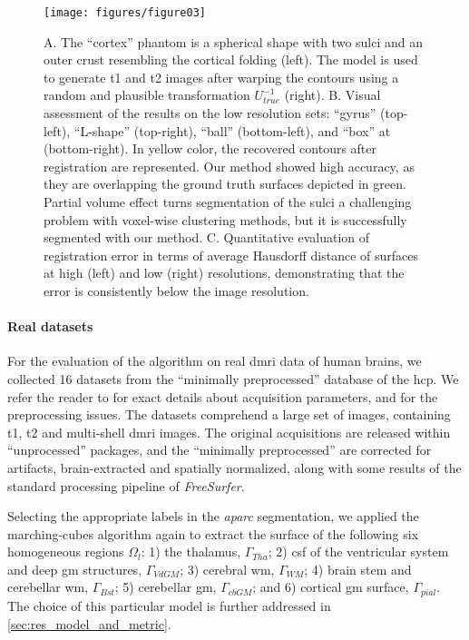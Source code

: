 \begin{figure*}
	\texttt{[image: figures/figure03]}
	\caption{A. The ``cortex'' phantom is a spherical shape with two sulci and an
	  outer crust resembling the cortical folding (left).
	The model is used to generate \gls*{t1} and \gls*{t2} images after warping the
	  contours using a random and plausible transformation $U_{true}^{-1}$ (right).
	B. Visual assessment of the results on the low resolution sets:
	  ``gyrus'' (top-left), ``L-shape'' (top-right), ``ball'' (bottom-left),
	  and ``box'' at (bottom-right).
	In yellow color, the recovered contours after registration are represented.
	Our method showed high accuracy, as they are overlapping the ground truth surfaces
	  depicted in green.
	Partial volume effect turns segmentation of the sulci a challenging problem with voxel-wise
	  clustering methods, but it is successfully segmented with our method.
	C. Quantitative evaluation of registration error in terms of average Hausdorff distance of
	  surfaces at high (left) and low (right) resolutions, demonstrating that the error is
	  consistently below the image resolution.
	  }\label{fig:phantom}
\end{figure*}

\paragraph*{Real datasets} %
\label{sec:human_connectome}
%
For the evaluation of the algorithm on real \gls*{dmri} data of human brains,
  we collected 16 datasets from the ``minimally preprocessed''
	 database of the \gls*{hcp}.
We refer the reader to \citep{essen_human_2012} for exact details about acquisition
  parameters, and \citep{glasser_minimal_2013} for the preprocessing issues.
The datasets comprehend a large set of images, containing \gls*{t1}, \gls*{t2} and
  multi-shell \gls*{dmri} images.
The original acquisitions are released within ``unprocessed'' packages, and
  the ``minimally preprocessed'' are corrected for artifacts, brain-extracted
  and spatially normalized, along with some results of the standard processing
  pipeline of \emph{FreeSurfer}.

Selecting the appropriate labels in the \emph{aparc} segmentation, we applied
  the marching-cubes algorithm again to extract the surface of the following
  six homogeneous regions $\Omega_l$:
  1) the thalamus, $\Gamma_{Tha}$;
  2) \gls*{csf} of the ventricular system and deep \gls*{gm} structures, $\Gamma_{VdGM}$;
  3) cerebral \gls*{wm}, $\Gamma_{WM}$;
  4) brain stem and cerebellar \gls*{wm}, $\Gamma_{Bst}$;
	5) cerebellar \gls*{gm}, $\Gamma_{cbGM}$; and
	6) cortical \gls*{gm} surface, $\Gamma_{pial}$.
The choice of this particular model is further addressed in \autoref{sec:res_model_and_metric}.

